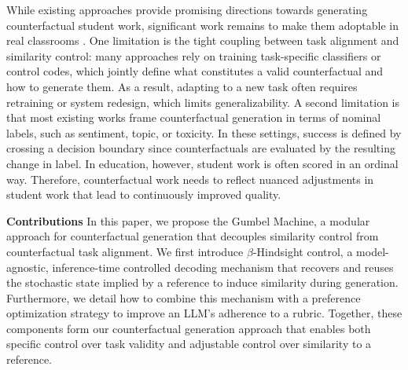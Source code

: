 \documentclass[11pt]{article}
\begin{document}
While existing approaches provide promising directions towards generating counterfactual student work, significant work remains to make them adoptable in real classrooms \cite{filighera_towards_2022}. One limitation is the tight coupling between task alignment and similarity control: many approaches rely on training task-specific classifiers or control codes, which jointly define what constitutes a valid counterfactual and how to generate them. As a result, adapting to a new task often requires retraining or system redesign, which limits generalizability. A second limitation is that most existing works frame counterfactual generation in terms of nominal labels, such as sentiment, topic, or toxicity. In these settings, success is defined by crossing a decision boundary since counterfactuals are evaluated by the resulting change in label. %
In education, however, student work is often scored in an ordinal way. Therefore, counterfactual work needs to reflect nuanced adjustments in student work that lead to continuously improved quality.


\textbf{Contributions} In this paper, we propose the Gumbel Machine, a modular approach for counterfactual generation that decouples similarity control from counterfactual task alignment. We first introduce $\beta$-Hindsight control, a model-agnostic, inference-time controlled decoding mechanism that recovers and reuses the stochastic state implied by a reference to induce similarity during generation. Furthermore, we detail how to combine this mechanism with a preference optimization strategy to improve an LLM's adherence to a rubric. Together, these components form our counterfactual generation approach that enables both specific control over task validity and adjustable control over similarity to a reference.
\end{document}
